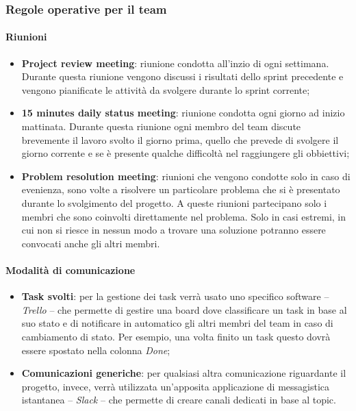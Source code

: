 \documentclass{article}
\begin{document}
  \subsubsection{Regole operative per il team}

  \paragraph{Riunioni}

  \begin{itemize}
    \item \textbf{Project review meeting}: riunione condotta all'inzio di ogni settimana. Durante questa riunione vengono 
      discussi i risultati dello sprint precedente e vengono pianificate le attività da svolgere durante lo sprint corrente;
    \item \textbf{15 minutes daily status meeting}: riunione condotta ogni giorno ad inizio mattinata. Durante questa riunione  
      ogni membro del team discute brevemente il lavoro svolto il giorno prima, quello che prevede di svolgere il giorno corrente e
      se è presente qualche difficoltà nel raggiungere gli obbiettivi;
    \item \textbf{Problem resolution meeting}: riunioni che vengono condotte solo in caso di evenienza, sono volte a risolvere un particolare
      problema che si è presentato durante lo svolgimento del progetto. A queste riunioni partecipano solo i membri che sono coinvolti
      direttamente nel problema. Solo in casi estremi, in cui non si riesce in nessun modo a trovare una soluzione potranno essere convocati
      anche gli altri membri.
  \end{itemize}

  \paragraph{Modalità di comunicazione}
  \begin{itemize}
    \item \textbf{Task svolti}: per la gestione dei task verrà usato uno specifico software -- \emph{Trello} --
      che permette di gestire una board dove classificare un task in base al suo stato e di notificare in automatico
      gli altri membri del team in caso di cambiamento di stato. Per esempio, una volta finito un task questo dovrà 
      essere spostato nella colonna \emph{Done};
    \item \textbf{Comunicazioni generiche}: per qualsiasi altra comunicazione riguardante il progetto, invece, verrà
      utilizzata un'apposita applicazione di messagistica istantanea -- \emph{Slack} -- che permette di creare canali 
      dedicati in base al topic.
  \end{itemize}
\end{document}
